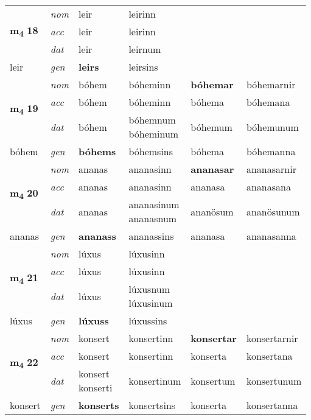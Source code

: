 \begin{longtable}[l]{X>{\footnotesize\itshape}XXXXX}
\multirow{3}{*}{{{\textbf{m{\textsubscript{4}}} \Large{\textbf{18}}}}} & nom & leir & leirinn & \textbf{} &  \\*
 & acc & leir & leirinn &  &  \\*
 & dat & leir & leirnum &  &  \\*
 {\footnotesize{leir}} & gen & \textbf{leirs} & leirsins &  &  \\
\midrule

\multirow{3}{*}{{{\textbf{m{\textsubscript{4}}} \Large{\textbf{19}}}}} & nom & bóhem & bóheminn & \textbf{bóhemar} & bóhemarnir \\*
 & acc & bóhem & bóheminn & bóhema & bóhemana \\*
 & dat & bóhem & \specialcell{bóhemnum\\ bóheminum} & bóhemum & bóhemunum \\*
 {\footnotesize{bóhem}} & gen & \textbf{bóhems} & bóhemsins & bóhema & bóhemanna \\
\midrule

\multirow{3}{*}{{{\textbf{m{\textsubscript{4}}} \Large{\textbf{20}}}}} & nom & ananas & ananasinn & \textbf{ananasar} & ananasarnir \\*
 & acc & ananas & ananasinn & ananasa & ananasana \\*
 & dat & ananas & \specialcell{ananasinum\\ ananasnum} & ananösum & ananösunum \\*
 {\footnotesize{ananas}} & gen & \textbf{ananass} & ananassins & ananasa & ananasanna \\
\midrule

\multirow{3}{*}{{{\textbf{m{\textsubscript{4}}} \Large{\textbf{21}}}}} & nom & lúxus & lúxusinn & \textbf{} &  \\*
 & acc & lúxus & lúxusinn &  &  \\*
 & dat & lúxus & \specialcell{lúxusnum\\ lúxusinum} &  &  \\*
 {\footnotesize{lúxus}} & gen & \textbf{lúxuss} & lúxussins &  &  \\
\midrule

\multirow{3}{*}{{{\textbf{m{\textsubscript{4}}} \Large{\textbf{22}}}}} & nom & konsert & konsertinn & \textbf{konsertar} & konsertarnir \\*
 & acc & konsert & konsertinn & konserta & konsertana \\*
 & dat & \specialcell{konsert\\ konserti} & konsertinum & konsertum & konsertunum \\*
 {\footnotesize{konsert}} & gen & \textbf{konserts} & konsertsins & konserta & konsertanna \\
\midrule


\end{longtable}
